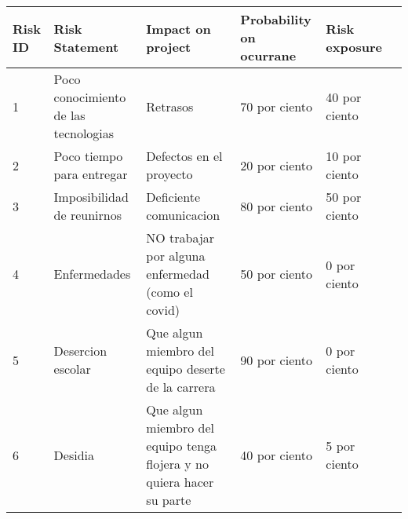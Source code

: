 \documentclass{article}
\begin{document}
\begin{tabular}{|p{2cm}|p{2cm}|p{2cm}| p{2cm}| p{2cm}| p{2cm}|}
\hline 	
Risk ID& Risk Statement& Impact on project&Probability on ocurrane & Risk exposure  \\\hline 

1& Poco conocimiento de las tecnologias & Retrasos& 70 por ciento & 40 por ciento \\\hline 

2& Poco tiempo para entregar& Defectos en el proyecto& 20 por ciento & 10 por ciento \\\hline 

3& Imposibilidad de reunirnos& Deficiente comunicacion& 80 por ciento & 50 por ciento \\\hline 

4& Enfermedades& NO trabajar por alguna enfermedad (como el covid)& 50 por ciento & 0 por ciento \\\hline 

5& Desercion escolar& Que algun miembro del equipo deserte de la carrera& 90 por ciento & 0 por ciento \\\hline 

6& Desidia& Que algun miembro del equipo tenga flojera y no quiera hacer su parte& 40 por ciento & 5 por ciento \\\hline 









	
\end{tabular} 
\end{document}
